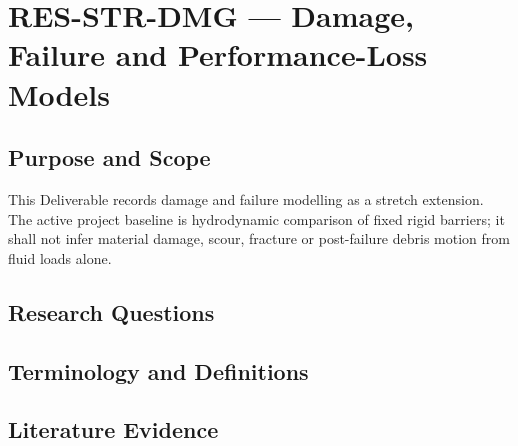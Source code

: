 
\section{RES-STR-DMG --- Damage, Failure and Performance-Loss Models}
\label{sec:res-str-dmg}

\subsection{Purpose and Scope}
\label{sec:res-str-dmg-purpose}

This Deliverable records damage and failure modelling as a stretch
extension. The active project baseline is hydrodynamic comparison of
fixed rigid barriers; it shall not infer material damage, scour,
fracture or post-failure debris motion from fluid loads alone.

\subsection{Research Questions}
\label{sec:res-str-dmg-research-questions}


\subsection{Terminology and Definitions}
\label{sec:res-str-dmg-definitions}


\subsection{Literature Evidence}
\label{sec:res-str-dmg-literature-evidence}

%

